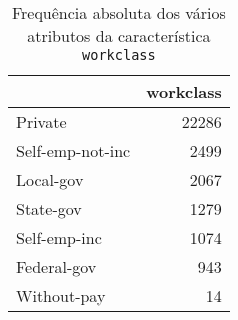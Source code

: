 \begin{table}
\centering
\caption{Frequência absoluta dos vários atributos da característica \texttt{workclass}}
\begin{tabular}{lr}
\toprule
{} &  workclass \\
\midrule
 Private          &      22286 \\
 Self-emp-not-inc &       2499 \\
 Local-gov        &       2067 \\
 State-gov        &       1279 \\
 Self-emp-inc     &       1074 \\
 Federal-gov      &        943 \\
 Without-pay      &         14 \\
\bottomrule
\end{tabular}
\end{table}
